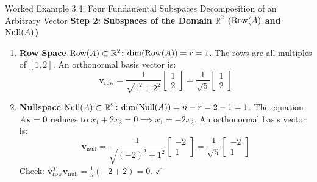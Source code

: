 \begin{examplebox}{Worked Example 3.4: Four Fundamental Subspaces Decomposition of an Arbitrary Vector}
\textbf{Step 2: Subspaces of the Domain $\mathbb{R}^2$ ($\operatorname{Row}(A)$ and $\operatorname{Null}(A)$)}
\begin{enumerate}
    \item \textbf{Row Space $\operatorname{Row}(A) \subset \mathbb{R}^2$:}
    $\dim(\operatorname{Row}(A)) = r = 1$. The rows are all multiples of $[1, 2]$. An orthonormal basis vector is:
    \begin{equation*}
    \mathbf{v}_{\mathrm{row}} = \frac{1}{\sqrt{1^2 + 2^2}} \begin{bmatrix} 1 \\ 2 \end{bmatrix} = \frac{1}{\sqrt{5}} \begin{bmatrix} 1 \\ 2 \end{bmatrix}
    \end{equation*}
    \item \textbf{Nullspace $\operatorname{Null}(A) \subset \mathbb{R}^2$:}
    $\dim(\operatorname{Null}(A)) = n - r = 2 - 1 = 1$. The equation $A\mathbf{x} = \mathbf{0}$ reduces to $x_1 + 2x_2 = 0 \implies x_1 = -2x_2$. An orthonormal basis vector is:
    \begin{equation*}
    \mathbf{v}_{\mathrm{null}} = \frac{1}{\sqrt{(-2)^2 + 1^2}} \begin{bmatrix} -2 \\ 1 \end{bmatrix} = \frac{1}{\sqrt{5}} \begin{bmatrix} -2 \\ 1 \end{bmatrix}
    \end{equation*}
    Check: $\mathbf{v}_{\mathrm{row}}^T \mathbf{v}_{\mathrm{null}} = \frac{1}{5}(-2 + 2) = 0$. $\checkmark$
\end{enumerate}


\end{examplebox}
